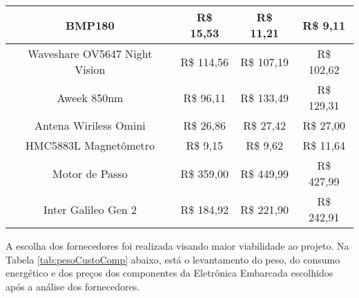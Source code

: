 \begin{table}[H]
\begin{tabular}{|c|c|c|c|}
      BMP180                                                             & R\$ 15,53        & R\$ 11,21		              & R\$ 9,11                                                           \\ \hline
      Waveshare OV5647 Night Vision                                      & R\$ 114,56       & R\$ 107,19	              & R\$ 102,62                                               \\ \hline
      Aweek 850nm                                                        & R\$ 96,11        & R\$ 133,49		      & R\$ 129,31                                               \\ \hline
      Antena Wiriless Omini                                              & R\$ 26,86        & R\$ 27,42		              & R\$ 27,00                                                          \\ \hline
      HMC5883L Magnetômetro                                              & R\$ 9,15         & R\$ 9,62 			      & R\$ 11,64                                                  \\ \hline
      Motor de Passo                                                     & R\$ 359,00       & R\$ 449,99		      & R\$ 427,99                                                         \\ \hline
      Inter Galileo Gen 2                                                & R\$ 184,92       & R\$ 221,90		      & R\$ 242,91                                                 \\ \hline
    \end{tabular}
    \label{tab:CompCusto}
  \end{table}



		  A escolha dos fornecedores foi realizada visando maior viabilidade ao projeto. Na Tabela \ref{tab:pesoCustoComp} abaixo, está o levantamento do peso, do consumo energético e dos preços
		  dos componentes da Eletrônica Embarcada escolhidos após a análise dos fornecedores.

